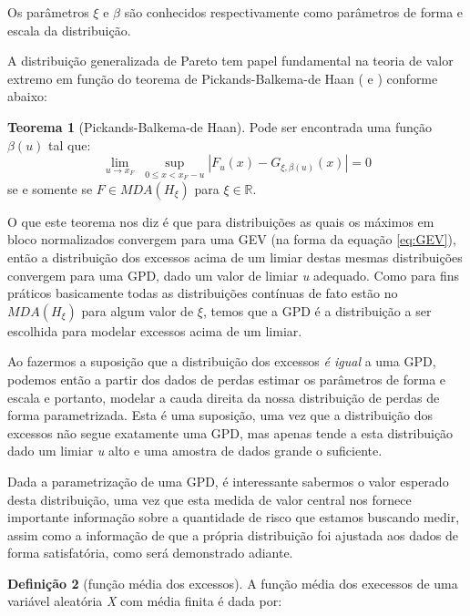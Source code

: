 \documentclass[review]{elsarticle}
\theoremstyle{definition}
\newtheorem{teor}{Teorema}%
\newtheorem{defi}[teor]{Definição}
\begin{document}
Os parâmetros $\xi$ e $\beta$ são conhecidos respectivamente como parâmetros de forma e escala da distribuição. 

A distribuição generalizada de Pareto tem papel fundamental na teoria de valor extremo em função do teorema de Pickands-Balkema-de Haan (\cite{Pickands1975} e \cite{Balkema1974}) conforme abaixo:

\begin{teor}[Pickands-Balkema-de Haan]
	\label{teor:pickands}
	Pode ser encontrada uma função $\beta(u)$ tal que:
	\begin{equation*}
	\lim\limits_{u \rightarrow x_F} \; \sup\limits_{0\leq x <x_F - u} |F_u(x)-G_{\xi, \beta(u)}(x)| = 0 
	\end{equation*}
	se e somente se $F\in MDA(H_\xi)$ para $\xi \in \mathbb{R}$.
\end{teor}

O que este teorema nos diz é que para distribuições as quais os máximos em bloco normalizados convergem para uma GEV (na forma da equação \eqref{eq:GEV}), então a distribuição dos excessos acima de um limiar destas mesmas distribuições convergem para uma GPD, dado um valor de limiar \emph{u} adequado. Como para fins práticos basicamente todas as distribuições contínuas de fato estão no $MDA(H_\xi)$ para algum valor de $\xi$, temos que a GPD é a distribuição a ser escolhida para modelar excessos acima de um limiar.

Ao fazermos a suposição que a distribuição dos excessos \emph{é igual} a uma GPD, podemos então a partir dos dados de perdas estimar os parâmetros de forma e escala e portanto, modelar a cauda direita da nossa distribuição de perdas de forma parametrizada. Esta é uma suposição, uma vez que a distribuição dos excessos não segue exatamente uma GPD, mas apenas tende a esta distribuição dado um limiar \emph{u} alto e uma amostra de dados grande o suficiente.

Dada a parametrização de uma GPD, é interessante sabermos o valor esperado desta distribuição, uma vez que esta medida de valor central nos fornece importante informação sobre a quantidade de risco que estamos buscando medir, assim como a informação de que a própria distribuição foi ajustada aos dados de forma satisfatória, como será demonstrado adiante.

\begin{defi}[função média dos excessos]
	\label{defi:meanexcess}
	A função média dos execessos de uma variável aleatória \emph{X} com média finita é dada por:
\end{defi}
\end{document}
